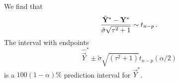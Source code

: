 We find that
\[
\frac{\hat{\mathbf{Y}}^* - \mathbf{Y}^*}{\tilde{\sigma}\sqrt{\tau^2 + 1}} \sim t_{n-p} \, {.}
\]
The interval with endpoints
\[
\hat{\vec{Y}}^* \pm \tilde{\sigma}\sqrt{(\tau^2 + 1)} t_{n-p}(\alpha / 2)
\]
is a $100(1-\alpha)\%$ prediction interval for $\vec{Y}^*$.
